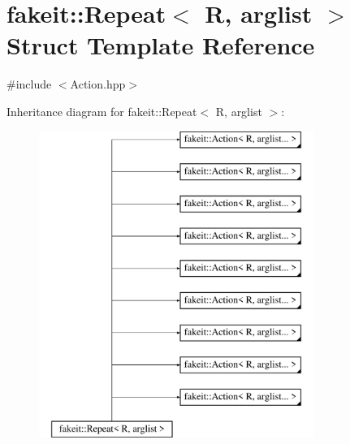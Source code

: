 \hypertarget{structfakeit_1_1Repeat}{}\section{fakeit\+::Repeat$<$ R, arglist $>$ Struct Template Reference}
\label{structfakeit_1_1Repeat}


{\ttfamily \#include $<$Action.\+hpp$>$}

Inheritance diagram for fakeit\+::Repeat$<$ R, arglist $>$\+:\begin{figure}[H]
\begin{center}
\leavevmode
\includegraphics[height=10.000000cm]{structfakeit_1_1Repeat}
\end{center}
\end{figure}
